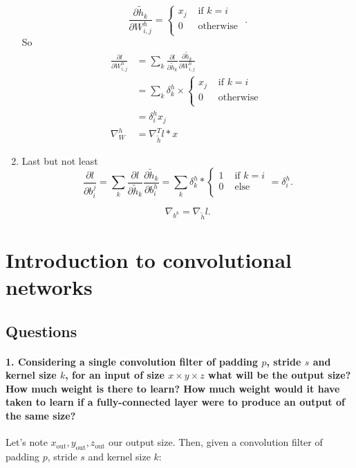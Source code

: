 \documentclass{article}
\theoremstyle{plain}%
\theoremstyle{definition}
\theoremstyle{remark}
\begin{document}
\begin{enumerate}
    \[
        \frac{\partial \tilde{h}_k}{\partial W^h_{i,j}} = \begin{cases}
            x_j &\text{ if } k = i\\
            0 &\text{ otherwise }\\
        \end{cases} 
    .\]
    So \begin{align*}
        \frac{\partial l}{\partial W^h _{i,j}} &= \sum_{k}^{} \frac{\partial l}{\partial \tilde{h}_k} \frac{\partial \tilde{h}_k}{\partial W^h_{i,j}} \\
            &= \sum_{k}^{}\delta ^h_k \times \begin{cases}
                x_j &\text{ if } k = i\\
                0 &\text{ otherwise }\\
            \end{cases} \\
            &= \delta _i^h x_j \\
        \nabla _W^h &= \nabla _{\tilde{h}} ^T l * x
    \end{align*}


    \item Last but not least 
    \[
        \frac{\partial l}{\partial b_i^j} = \sum_{k}^{} \frac{\partial l}{\partial \tilde{h}_k} \frac{\partial \tilde{h}_k}{\partial b_i^h} = \sum_{k}^{}\delta _k^h * \begin{cases}
            1 &\text{ if } k = i\\
            0 &\text{ else}\\
        \end{cases} = \delta ^h_i
    .\]
    
    \[
        \nabla _{b^h} = \nabla _{\tilde{h}} l
    .\]
    
\end{enumerate}

\section{Introduction to convolutional networks}
\subsection{Questions}
\paragraph{1. Considering a single convolution filter of padding $p$, stride $s$ and kernel size $k$, for an input of size $x \times y \times z$ what will be the output size?
How much weight is there to learn?
How much weight would it have taken to learn if a fully-connected layer were to produce an output of the same size?} 
Let's note $x_{\text{out}}, y_{\text{out}}, z_{\text{out}}$ our output size. Then, given a convolution filter of padding $p$, stride $s$ and kernel size $k$:
\end{document}
